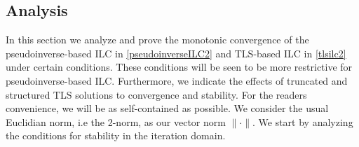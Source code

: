 \subsection{Analysis}\label{monotonic}

In this section we analyze and prove the monotonic convergence of the pseudoinverse-based ILC in \eqref{pseudoinverseILC2} and TLS-based ILC in \eqref{tlsilc2} under certain conditions. These conditions will be seen to be more restrictive for pseudoinverse-based ILC. Furthermore, we indicate the effects of truncated and structured TLS solutions to convergence and stability. For the readers convenience, we will be as self-contained as possible. We consider the usual Euclidian norm, i.e the 2-norm, as our vector norm $\|\cdot\|$. We start by analyzing the conditions for stability in the iteration domain. 


